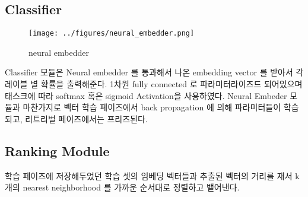 \subsection{Classifier}
\begin{figure}
  \texttt{[image: ../figures/neural\_embedder.png]}
  \caption{neural embedder}
  \label{fig:three}
\end{figure}

Classifier 모듈은 Neural embedder 를 통과해서 나온 embedding vector 를 받아서 각 레이블 별 확률을 출력해준다. 1차원 fully connected 로 파라미터라이즈드 되어있으며 태스크에 따라 softmax 혹은 sigmoid Activation을 사용하였다. Neural Embeder 모듈과 마찬가지로 벡터 학습 페이즈에서 back propagation 에 의해 파라미터들이 학습되고, 리트리벌 페이즈에서는 프리즈된다. 


\subsection{Ranking Module}
학습 페이즈에 저장해두었던 학습 셋의 임베딩 벡터들과 추출된 벡터의 거리를 재서 k 개의 nearest neighborhood 를 가까운 순서대로 정렬하고 뱉어낸다.


